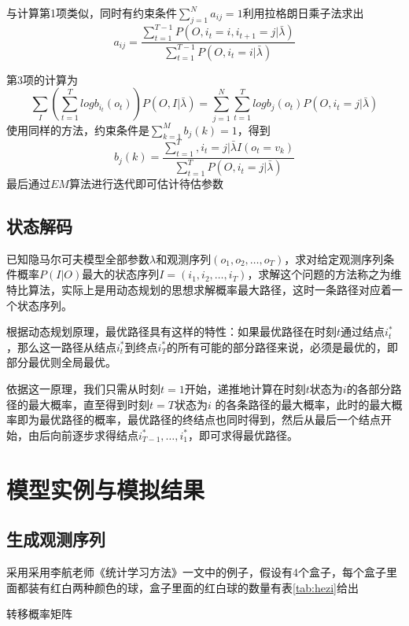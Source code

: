 \documentclass[a4paper,12pt]{ctexart}     %
\begin{document}
	与计算第1项类似，同时有约束条件$ \sum_{j=1}^{N}a_{ij}=1 $利用拉格朗日乘子法求出
	\begin{equation}
		a_{ij}=\frac{\sum\limits_{t=1}^{T-1}P(O,i_t=i,i_{t+1}=j|\bar{\lambda})}{\sum\limits_{t=1}^{T-1}P(O,i_t=i|\bar{\lambda})}
	\end{equation}

	第3项的计算为
	\begin{equation}
		\sum_I(\sum\limits_{t=1}^{T}logb_{i_t}(o_t))P(O,I|\bar{\lambda}) = \sum\limits_{j=1}^{N}\sum\limits_{t=1}^{T}logb_j(o_t)P(O,i_t=j|\bar{\lambda})
	\end{equation}
	使用同样的方法，约束条件是$ \sum_{k=1}^{M} b_j(k) =1 $，得到
	\begin{equation}
		b_j(k)=\frac{\sum\limits_{t=1}^T,i_t = j|\bar{\lambda}I(o_t=v_k)}{\sum\limits_{t=1}^TP(O,i_t=j|\bar{\lambda})}
	\end{equation}
	最后通过$ EM $算法进行迭代即可估计待估参数
		\subsection{状态解码}
	已知隐马尔可夫模型全部参数$ \lambda $和观测序列$ (o_1,o_2,\dots,o_T) $，求对给定观测序列条件概率$ P(I|O) $最大的状态序列$ I = (i_1,i_2,\dots,i_T) $，求解这个问题的方法称之为维特比算法，实际上是用动态规划的思想求解概率最大路径，这时一条路径对应着一个状态序列。
	
	根据动态规划原理，最优路径具有这样的特性：如果最优路径在时刻$ t $通过结点$ i_t^* $，那么这一路径从结点$ i_t^* $到终点$ i_T^* $的所有可能的部分路径来说，必须是最优的，即部分最优则全局最优。
	
	依据这一原理，我们只需从时刻$ t=1 $开始，递推地计算在时刻$ t $状态为$ i $的各部分路径的最大概率，直至得到时刻$ t=T $状态为$ i $ 的各条路径的最大概率，此时的最大概率即为最优路径的概率，最优路径的终结点也同时得到，然后从最后一个结点开始，由后向前逐步求得结点$ i_{T-1}^*,\dots,i_1^* $，即可求得最优路径。
	\section{模型实例与模拟结果}
		\subsection{生成观测序列}
	采用采用李航老师《统计学习方法》一文中的例子，假设有4个盒子，每个盒子里面都装有红白两种颜色的球，盒子里面的红白球的数量有表\ref{tab:hezi}给出
	
	转移概率矩阵
	
\end{document}
